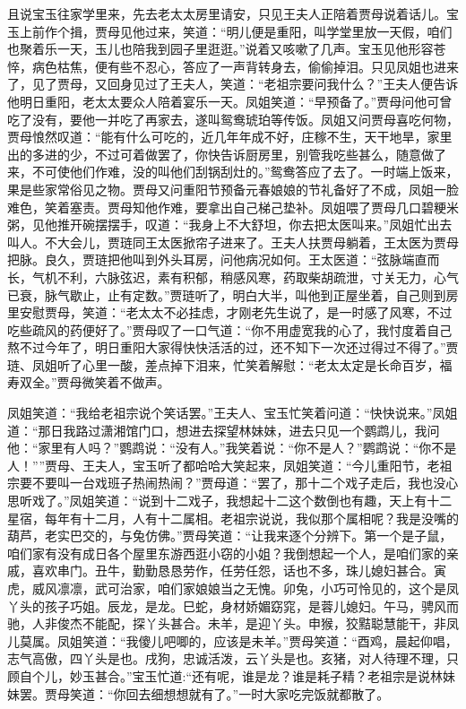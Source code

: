 \documentclass[12pt,oneside]{book}
\begin{document}
且说宝玉往家学里来，先去老太太房里请安，只见王夫人正陪着贾母说着话儿。宝玉上前作个揖，贾母见他过来，笑道：“明儿便是重阳，叫学堂里放一天假，咱们也聚着乐一天，玉儿也陪我到园子里逛逛。”说着又咳嗽了几声。宝玉见他形容苍悴，病色枯焦，便有些不忍心，答应了一声背转身去，偷偷掉泪。只见凤姐也进来了，见了贾母，又回身见过了王夫人，笑道：“老祖宗要问我什么？”王夫人便告诉他明日重阳，老太太要众人陪着宴乐一天。凤姐笑道：“早预备了。”贾母问他可曾吃了没有，要他一并吃了再家去，遂叫鸳鸯琥珀等传饭。凤姐又问贾母喜吃何物，贾母悢然叹道：“能有什么可吃的，近几年年成不好，庄稼不生，天干地旱，家里出的多进的少，不过可着做罢了，你快告诉厨房里，别管我吃些甚么，随意做了来，不可使他们作难，没的叫他们刮锅刮灶的。”鸳鸯答应了去了。一时端上饭来，果是些家常俗见之物。贾母又问重阳节预备元春娘娘的节礼备好了不成，凤姐一脸难色，笑着塞责。贾母知他作难，要拿出自己梯己垫补。凤姐喂了贾母几口碧粳米粥，见他推开碗摆摆手，叹道：“我身上不大舒坦，你去把太医叫来。”凤姐忙出去叫人。不大会儿，贾琏同王太医掀帘子进来了。王夫人扶贾母躺着，王太医为贾母把脉。良久，贾琏把他叫到外头耳房，问他病况如何。王太医道：“弦脉端直而长，气机不利，六脉弦迟，素有积郁，稍感风寒，药取柴胡疏泄，寸关无力，心气已衰，脉气歇止，止有定数。”贾琏听了，明白大半，叫他到正屋坐着，自己则到房里安慰贾母，笑道：“老太太不必挂虑，才刚老先生说了，是一时感了风寒，不过吃些疏风的药便好了。”贾母叹了一口气道：“你不用虚宽我的心了，我忖度着自己熬不过今年了，明日重阳大家得快快活活的过，还不知下一次还过得过不得了。”贾琏、凤姐听了心里一酸，差点掉下泪来，忙笑着解慰：“老太太定是长命百岁，福寿双全。”贾母微笑着不做声。

凤姐笑道：“我给老祖宗说个笑话罢。”王夫人、宝玉忙笑着问道：“快快说来。”凤姐道：“那日我路过潇湘馆门口，想进去探望林妹妹，进去只见一个鹦鹉儿，我问他：“家里有人吗？”鹦鹉说：“没有人。”我笑着说：“你不是人？”鹦鹉说：“你不是人！””贾母、王夫人，宝玉听了都哈哈大笑起来，凤姐笑道：“今儿重阳节，老祖宗要不要叫一台戏班子热闹热闹？”贾母道：“罢了，那十二个戏子走后，我也没心思听戏了。”凤姐笑道：“说到十二戏子，我想起十二这个数倒也有趣，天上有十二星宿，每年有十二月，人有十二属相。老祖宗说说，我似那个属相呢？我是没嘴的葫芦，老实巴交的，与兔仿佛。”贾母笑道：“让我来逐个分辨下。第一个是子鼠，咱们家有没有成日各个屋里东游西逛小窃的小姐？我倒想起一个人，是咱们家的亲戚，喜欢串门。丑牛，勤勤恳恳劳作，任劳任怨，话也不多，珠儿媳妇甚合。寅虎，威风凛凛，武可治家，咱们家娘娘当之无愧。卯兔，小巧可怜见的，这个是凤丫头的孩子巧姐。辰龙，是龙。巳蛇，身材娇媚窈窕，是蓉儿媳妇。午马，骋风而驰，人非俊杰不能配，探丫头甚合。未羊，是迎丫头。申猴，狡黠聪慧能干，非凤儿莫属。凤姐笑道：“我傻儿吧唧的，应该是未羊。”贾母笑道：“酉鸡，晨起仰唱，志气高傲，四丫头是也。戌狗，忠诚活泼，云丫头是也。亥猪，对人待理不理，只顾自个儿，妙玉甚合。”宝玉忙道:“还有呢，谁是龙？谁是耗子精？老祖宗是说林妹妹罢。贾母笑道：“你回去细想想就有了。”一时大家吃完饭就都散了。
\end{document}
